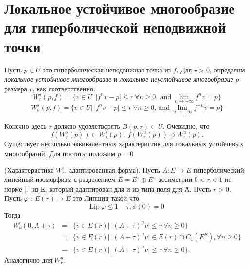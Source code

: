 \section{Локальное устойчивое многообразие для гиперболической неподвижной точки}

Пусть $p \in U$ это гиперболическая неподвижная точка из $f$. Для $r > 0$, определим \textit{локальное устойчивое многообразие} и \textit{локальное неустойчивое многообразие} $p$ размера $r$, как соответственно:
$$
W_r^s(p,f)=\{v \in U | \ | f^nv-p| \leqslant r \ \forall n \geqslant 0, \ \textrm{and} \ \lim\limits_{n \to +\infty} {f^nv=p}\}
$$
$$
W_u^s(p,f)=\{v \in U | \ | f^nv-p| \leqslant r \ \forall n \geqslant 0, \ \textrm{and} \ \lim\limits_{n \to +\infty} {f^{-n}v=p}\}
$$

Конечно здесь $r$ должно удовлетворять $B(p,r) \subset U$. Очевидно, что
$$
f(W^s_r(p)) \subset W^s_r(p), \ f(W^u_r(p)) \supset W^u_r(p).
$$
Существует несколько эквивалентных характеристик для локальных устойчивых многообразий. Для постоты положим $p=0$ 
\begin{lemma}
\label{lemma2_14}
(Характеристика $W^s_r$, адаптированная форма). Пусть $A: E \rightarrow E$ гиперболический линейный изоморфизм с разделением $E = E^s \oplus E^u$ ассиметрии $0 < r < 1$  по норме |.| из $Е$, который адаптирован для и из типа поля для $А$. Пусть $r > 0$. Пусть $\varphi$ : $E(r) \rightarrow E$ это Липшиц такой что
$$
\mathrm{Lip } \ \varphi  \leqslant 1 - \tau, \phi(0)=0
$$
Тогда 
$$
\begin{array}{rclll}
W_s^r(0, A + \tau) & = & \{v \in E(r) | \ | (A + \tau)^n v | \leqslant r \ \forall n \geqslant 0\} \\
                   & = & \{v \in E(r) | \ | (A + \tau)^n v | \in E(r) \cap C_1(E^S),  \forall n \geqslant 0\} \\
                   & = & \{v \in E(r) | \ | (A + \tau)^n v | \leqslant r \ \forall n \geqslant 0\}.
\end{array} 
$$
Аналогично для $W_r^u$.
\end{lemma}

